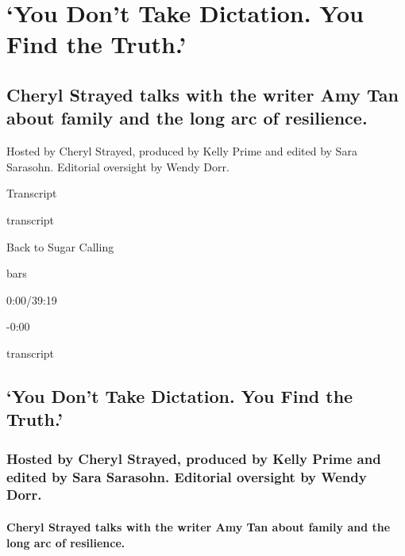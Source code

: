 \hypertarget{you-dont-take-dictation-you-find-the-truth-1}{%
\section{`You Don't Take Dictation. You Find the
Truth.'}\label{you-dont-take-dictation-you-find-the-truth-1}}

\hypertarget{cheryl-strayed-talks-with-the-writer-amy-tan-about-family-and-the-long-arc-of-resilience-1}{%
\subsection{Cheryl Strayed talks with the writer Amy Tan about family
and the long arc of
resilience.}\label{cheryl-strayed-talks-with-the-writer-amy-tan-about-family-and-the-long-arc-of-resilience-1}}

Hosted by Cheryl Strayed, produced by Kelly Prime and edited by Sara
Sarasohn. Editorial oversight by Wendy Dorr.

Transcript

transcript

Back to Sugar Calling

bars

0:00/39:19

-0:00

transcript

\hypertarget{you-dont-take-dictation-you-find-the-truth-2}{%
\subsection{`You Don't Take Dictation. You Find the
Truth.'}\label{you-dont-take-dictation-you-find-the-truth-2}}

\hypertarget{hosted-by-cheryl-strayed-produced-by-kelly-prime-and-edited-by-sara-sarasohn-editorial-oversight-by-wendy-dorr-1}{%
\subsubsection{Hosted by Cheryl Strayed, produced by Kelly Prime and
edited by Sara Sarasohn. Editorial oversight by Wendy
Dorr.}\label{hosted-by-cheryl-strayed-produced-by-kelly-prime-and-edited-by-sara-sarasohn-editorial-oversight-by-wendy-dorr-1}}

\hypertarget{cheryl-strayed-talks-with-the-writer-amy-tan-about-family-and-the-long-arc-of-resilience-2}{%
\paragraph{Cheryl Strayed talks with the writer Amy Tan about family and
the long arc of
resilience.}\label{cheryl-strayed-talks-with-the-writer-amy-tan-about-family-and-the-long-arc-of-resilience-2}}

